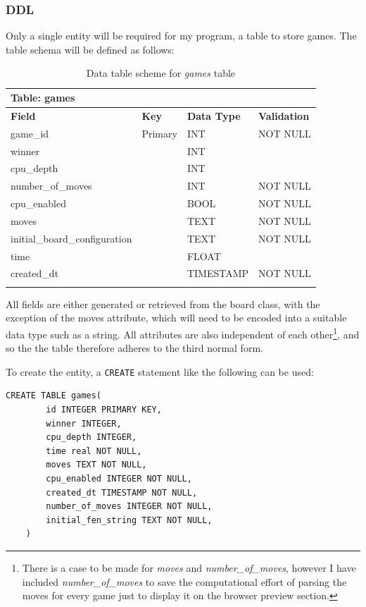 \documentclass[../main/main.tex]{subfiles}
\begin{document}
\subsubsection*{DDL}
\label{sec:design-ddl}
Only a single entity will be required for my program, a table to store games. The table schema will be defined as follows:

\begin{longtable}[c]{l|l|l|l}
    \multicolumn{4}{l}{\textbf{Table: games}}\\
    \toprule
    \textbf{Field} & \textbf{Key} & \textbf{Data Type} & \textbf{Validation}\\
    \midrule
    \endfirsthead
    \endhead

    game\_id & Primary & INT & NOT NULL\\
    winner &  & INT & \\
    cpu\_depth &  & INT & \\
    number\_of\_moves &  & INT & NOT NULL\\
    cpu\_enabled &  & BOOL & NOT NULL\\
    moves &  & TEXT & NOT NULL\\
    initial\_board\_configuration &  & TEXT & NOT NULL\\
    time &  & FLOAT & \\
    created\_dt &  & TIMESTAMP & NOT NULL\\

    \bottomrule
    
\caption{Data table scheme for \textit{games} table}
\label{tab:games-schema}
\end{longtable}

All fields are either generated or retrieved from the board class, with the exception of the moves attribute, which will need to be encoded into a suitable data type such as a string. All attributes are also independent of each other\footnote{There is a case to be made for \textit{moves} and \textit{number\_of\_moves}, however I have included \textit{number\_of\_moves} to save the computational effort of parsing the moves for every game just to display it on the browser preview section.}, and so the the table therefore adheres to the third normal form.

To create the entity, a \lstinline[language=sqlite]{CREATE} statement like the following can be used:

\begin{lstlisting}[language=sqlite, frame=lines]
    CREATE TABLE games(
        id INTEGER PRIMARY KEY,
        winner INTEGER,
        cpu_depth INTEGER,
        time real NOT NULL,
        moves TEXT NOT NULL,
        cpu_enabled INTEGER NOT NULL,
        created_dt TIMESTAMP NOT NULL,
        number_of_moves INTEGER NOT NULL,
        initial_fen_string TEXT NOT NULL,
    )
\end{lstlisting}
\end{document}

